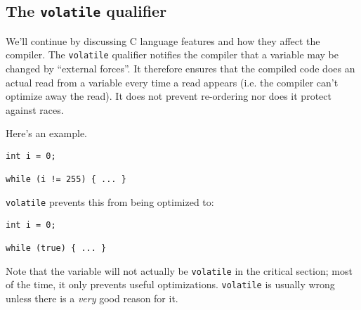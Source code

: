 \subsection*{The {\tt volatile} qualifier}
We'll continue by discussing C language features and how they affect
the compiler. The {\tt volatile} qualifier notifies the compiler that
a variable may be changed by ``external forces''. It therefore ensures
that the compiled code does an actual read from a variable every time
a read appears (i.e. the compiler can't optimize away the read). It
does not prevent re-ordering nor does it protect against races.

Here's an example.
  \begin{verbatim}
int i = 0;

while (i != 255) { ... }
  \end{verbatim}

{\tt volatile} prevents this from being optimized to:

  \begin{verbatim}
int i = 0;

while (true) { ... }
  \end{verbatim}

Note that the variable will not actually be {\tt volatile} in the
critical section; most of the time, it only prevents useful
optimizations. {\tt volatile} is usually wrong unless there is a
\emph{very} good reason for it.

  



